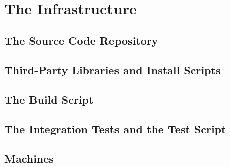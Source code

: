 \chapter{The Infrastructure} \label{cap:infrastructure}

\section{The Source Code Repository}
\section{Third-Party Libraries and Install Scripts}
\section{The Build Script}
\section{The Integration Tests and the Test Script}
\section{Machines}
